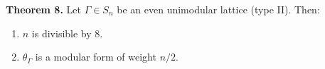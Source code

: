 \textbf{Theorem 8.} Let $\Gamma \in S_n$ be an even unimodular lattice (type II). Then:
\begin{enumerate}
\item[(a)] $n$ is divisible by 8.
\item[(b)] $\theta_\Gamma$ is a modular form of weight $n/2$.
\end{enumerate}
